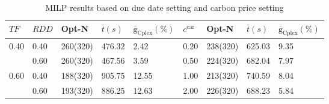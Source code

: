 \begin{table}[tb]
    \centering
    \caption{MILP results based on due date setting and carbon price setting}
    \label{tab:pd_parameter_results}
     \footnotesize
    \setlength{\tabcolsep}{5pt}
    \renewcommand{\arraystretch}{1.08}
    \begin{tabular}{@{}lllll@{\hspace{2.0em}}llll@{}}
        \toprule
        $TF$ & $RDD$ & Opt-N
        & $\bar{t}(s)$
        & {\scriptsize $\overline{\mathrm{g}}_{\mathrm{Cplex}}(\%)$}
        & \(c^{\mathrm{car}}\) & Opt-N
        & $\bar{t}(s)$
        & {\scriptsize $\overline{\mathrm{g}}_{\mathrm{Cplex}}(\%)$} \\
        \midrule
        0.40 & 0.40 & 260(320) & 476.32 & 2.42  & 0.20 & 238(320) & 625.03 & 9.35 \\
            & 0.60 & 260(320) & 467.56 & 3.59  & 0.50 & 224(320) & 682.04 & 7.97 \\
        0.60 & 0.40 & 188(320) & 905.75 & 12.55  & 1.00 & 213(320) & 740.59 & 8.04 \\
            & 0.60 & 193(320) & 886.25 & 12.63  & 2.00 & 226(320) & 688.23 & 5.84 \\
        \bottomrule
    \end{tabular}
\end{table}

